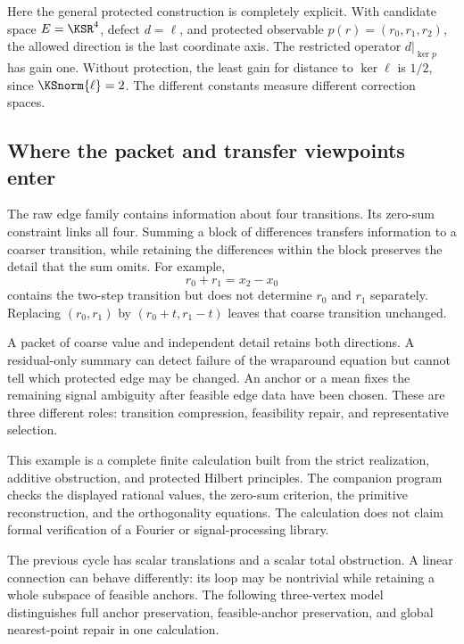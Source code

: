 Here the general protected construction is completely explicit. With candidate space \(E=\KSR^4\), defect \(d=\ell\), and protected observable \(p(r)=(r_0,r_1,r_2)\), the allowed direction is the last coordinate axis. The restricted operator \(d|_{\ker p}\) has gain one. Without protection, the least gain for distance to \(\ker\ell\) is \(1/2\), since \(\KSnorm{\ell}=2\). The different constants measure different correction spaces.

\subsection{Where the packet and transfer viewpoints enter}
The raw edge family contains information about four transitions. Its zero-sum constraint links all four. Summing a block of differences transfers information to a coarser transition, while retaining the differences within the block preserves the detail that the sum omits. For example,
\[
 r_0+r_1=x_2-x_0
\]
contains the two-step transition but does not determine \(r_0\) and \(r_1\) separately. Replacing \((r_0,r_1)\) by \((r_0+t,r_1-t)\) leaves that coarse transition unchanged.

A packet of coarse value and independent detail retains both directions. A residual-only summary can detect failure of the wraparound equation but cannot tell which protected edge may be changed. An anchor or a mean fixes the remaining signal ambiguity after feasible edge data have been chosen. These are three different roles: transition compression, feasibility repair, and representative selection.

This example is a complete finite calculation built from the strict realization, additive obstruction, and protected Hilbert principles. The companion program checks the displayed rational values, the zero-sum criterion, the primitive reconstruction, and the orthogonality equations. The calculation does not claim formal verification of a Fourier or signal-processing library.

\label{KS:sec:twisted-loop}
The previous cycle has scalar translations and a scalar total obstruction. A linear connection can behave differently: its loop may be nontrivial while retaining a whole subspace of feasible anchors. The following three-vertex model distinguishes full anchor preservation, feasible-anchor preservation, and global nearest-point repair in one calculation.

